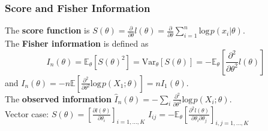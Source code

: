 \documentclass[10pt,twocolumn]{article}
\begin{document}
\subsubsection*{Score and Fisher Information}
The \textbf{score function} is $S(\theta) = \frac{\partial}{\partial\theta} l(\theta) = \frac{\partial}{\partial\theta} \sum_{i=1}^{n} \text{log} \hspace{1pt} p(x_{i}|\theta)$.\\
The \textbf{Fisher information} is defined as
\begin{equation}
    I_{n}(\theta) = \mathbb{E}_{\theta} \left[ S(\theta)^{2} \right] = \text{Var}_{\theta} \left[ S(\theta) \right] 
        = -\mathbb{E}_{\theta} \left[ \frac{\partial^{2}}{\partial\theta^{2}} l(\theta) \right]
\end{equation}
and $I_{n}(\theta) = -n\mathbb{E} \left[ \frac{\partial^{2}}{\partial\theta^{2}} \text{log}\hspace{1pt} p(X_{1};\theta) \right] = nI_{1}(\theta)$.\\
The \textbf{observed information} $\hat{I}_{n}(\theta) = -\sum_{i}\frac{\partial^{2}}{\partial\theta^{2}} \text{log}\hspace{1pt}p(X_{i};\theta)$.\\
Vector case: $S(\theta) = \left[ \frac{\partial l(\theta)}{\partial \theta_{i}} \right]_{i=1,\ldots,K}$ \hspace{1mm}
    $I_{ij} = -\mathbb{E}_{\theta}\left[\frac{\partial^{2} l(\theta)}{\partial\theta_{i}\partial\theta_{j}}\right]_{i,j=1,\ldots,K}$
\end{document}
